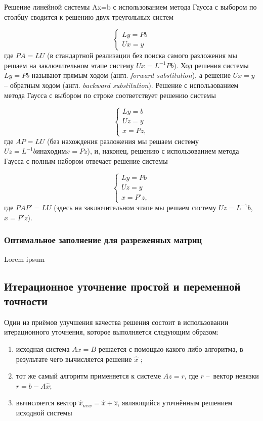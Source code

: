 Решение линейной системы Ax=b с использованием метода Гаусса с выбором по столбцу сводится к решению двух треугольных систем

\[
\begin{cases}
     Ly=Pb   \\
     Ux=y    
\end{cases}
\]
где $PA=LU$ (в стандартной реализации без поиска самого разложения мы решаем на заключительном этапе систему $Ux=L^{-1}Pb$). Ход решения системы $Ly=Pb$ называют прямым ходом (англ. \textit{forward substitution}), а решение $Ux=y$ – обратным ходом (англ. \textit{backward substitution}).
Решение с использованием метода Гаусса с выбором по строке соответствует решению системы

\[
\begin{cases}
	Ly = b \\
	Uz = y \\
	x = Pz,
\end{cases}
\] 
где $AP=LU$ (без нахождения разложения мы решаем систему $Uz=L^{-1}b и находим x=Pz$), и, наконец, решению с использованием метода Гаусса с полным набором отвечает решение системы 

\[
\begin{cases}
	Ly = Pb \\
	Uz = y  \\
	x = P'z,
\end{cases}
\] 
где $PAP'=LU$ (здесь на заключительном этапе мы решаем систему $Uz = L^{-1}b$, $x=P'z$). 


\subsubsection{Оптимальное заполнение для разреженных матриц}

Lorem ipsum 


\subsection{Итерационное уточнение простой и переменной точности}

Один из приёмов улучшения качества решения состоит в использовании итерационного уточнения, которое выполняется следующим образом:

\begin{enumerate}
	\item исходная система $Ax=B$ решается с помощью какого-либо алгоритма, в результате чего вычисляется решение $\hat{x}$ ;
	\item тот же самый алгоритм применяется к системе $Az=r$, где $r$ – вектор невязки $r=b-A\hat{x}$;
	\item вычисляется вектор $\hat{x}_{new} = \hat{x} + \hat{z}$, являющийся уточнённым решением исходной системы
\end{enumerate}

